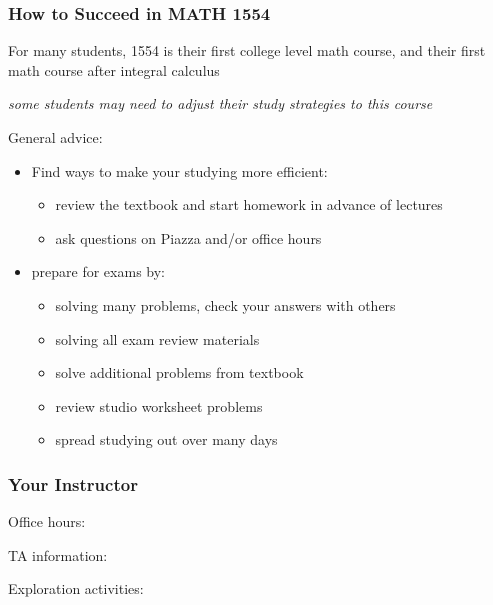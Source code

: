 \documentclass[xcolor=table,11pt,notes=hide,t,handout]{beamer}
\begin{document}
\begin{frame}\frametitle{How to Succeed in MATH 1554}

    For many students, 1554 is their first college level math course, and their first math course after integral calculus 
    \begin{center}
    	\textit{some students may need to adjust their study strategies to this course}
	\end{center}
    General advice:
    \begin{itemize}
        \item Find ways to make your studying more efficient:
        \begin{itemize}
            \item review the textbook and start homework in advance of lectures
            \item ask questions on Piazza and/or office hours
        \end{itemize}
        \item prepare for exams by:
        \begin{itemize}
            \item solving many problems, check your answers with others
            \item solving all exam review materials
            \item solve additional problems from textbook
            \item review studio worksheet problems
            \item spread studying out over many days
        \end{itemize}
        
    \end{itemize}


\end{frame}








\begin{frame}\frametitle{Your Instructor}

    Office hours: \\
    \vspace{24pt}
    
    TA information: \\
    \vspace{24pt}
    
    Exploration activities: 

\end{frame}
\end{document}
